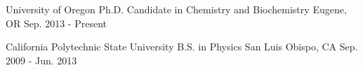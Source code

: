 \begin{cvpoints}

  \cvpoint
    {University of Oregon} %
    {Ph.D. Candidate in Chemistry and Biochemistry} %
    {Eugene, OR} %
    {Sep. 2013 - Present} %

  \cvpoint
    {California Polytechnic State University} %
    {B.S. in Physics} %
    {San Luis Obispo, CA} %
    {Sep. 2009 - Jun. 2013} %
\end{cvpoints}
